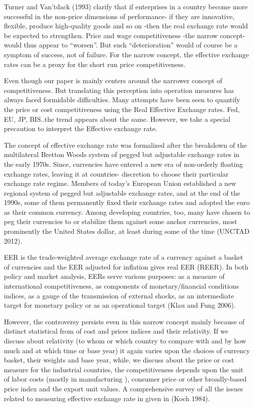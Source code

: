 \documentclass[]{elsarticle} %
\begin{document}
Turner and Van'tdack (1993) clarify that if enterprises in a country
become more successful in the non-price dimensions of performance- if
they are innovative, flexible, produce high-quality goods and so on
-then the real exchange rate would be expected to strengthen. Price and
wage competitiveness -the narrow concept- would thus appear to
``worsen''. But such ``deterioration'' would of course be a symptom of
success, not of failure. For the narrow concept, the effective exchange
rates can be a proxy for the short run price competitiveness.

Even though our paper is mainly centers around the narrower concept of
competitiveness. But translating this perception into operation measures
has always faced formidable difficulties. Many attempts have been seen
to quantify the price or cost competitiveness using the Real Effective
Exchange rates. Fed, EU, JP, BIS..the trend appears about the same.
However, we take a special precaution to interpret the Effective
exchange rate.

The concept of effective exchange rate was formalized after the
breakdown of the multilateral Bretton Woods system of pegged but
adjustable exchange rates in the early 1970s. Since, currencies have
entered a new era of non-orderly floating exchange rates, leaving it at
countries- discretion to choose their particular exchange rate regime.
Members of today's European Union established a new regional system of
pegged but adjustable exchange rates, and at the end of the 1990s, some
of them permanently fixed their exchange rates and adopted the euro as
their common currency. Among developing countries, too, many have chosen
to peg their currencies to or stabilize them against some anchor
currencies, most prominently the United States dollar, at least during
some of the time (UNCTAD 2012).

EER is the trade-weighted average exchange rate of a currency against a
basket of currencies and the EER adjusted for inflation gives real EER
(REER). In both policy and market analysis, EERs serve various purposes:
as a measure of international competitiveness, as components of
monetary/financial conditions indices, as a gauge of the transmission of
external shocks, as an intermediate target for monetary policy or as an
operational target (Klau and Fung 2006).

However, the controversy persists even in this narrow concept mainly
because of distinct statistical from of cost and prices indices and
their relativity. If we discuss about relativity (to whom or which
country to compare with and by how much and at which time or base year)
it again varies upon the choices of currency basket, their weights and
base year, while, we discuss about the price or cost measure for the
industrial countries, the competitiveness depends upon the unit of labor
costs (mostly in manufacturing ), consumer price or other broadly-based
price index and the export unit values. A comprehensive survey of all
the issues related to measuring effective exchange rate in given in
(Koch 1984).
\end{document}

